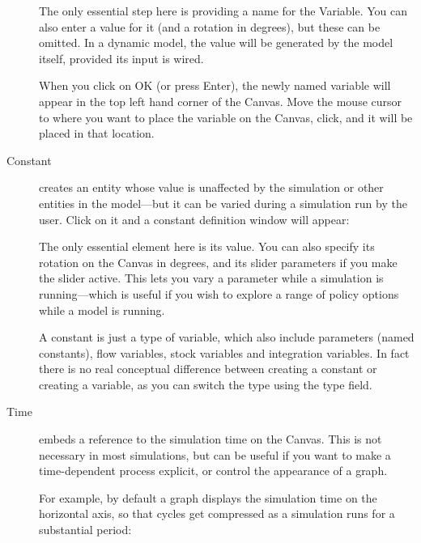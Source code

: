 \begin{description}
The only essential step here is providing a name for the Variable. You
can also enter a value for it (and a rotation in degrees), but these
can be omitted. In a dynamic model, the value will be generated by the
model itself, provided its input is wired.


When you click on OK (or press Enter), the newly named variable will
appear in the top left hand corner of the Canvas. Move the mouse
cursor to where you want to place the variable on the Canvas, click,
and it will be placed in that location.


\item[Constant]  \label{Constant} creates an entity whose
value is unaffected by the simulation or other entities in the
model---but it can be varied during a simulation run by the
user. Click on it and a constant definition window will appear:

\begin{center}
\end{center}

The only essential element here is its
value. You can also specify its rotation on the Canvas in degrees, and
its slider parameters if you make the slider active. This lets you vary a
parameter while a simulation is running---which is useful if you wish
to explore a range of policy options while a model is running.

A constant is just a type of variable, which also include parameters
(named constants), flow variables, stock variables and integration
variables. In fact there is no real conceptual difference between
creating a constant or creating a variable, as you can switch the type
using the type field.

\item[Time]  embeds a reference to the
simulation time on the Canvas. This is not necessary in most
simulations, but can be useful if you want to make a time-dependent
process explicit, or control the appearance of a graph. 

For example, by default a graph displays the simulation time on the
horizontal axis, so that cycles get compressed as a simulation runs
for a substantial period:

\begin{center}
\end{center}


\end{description}

